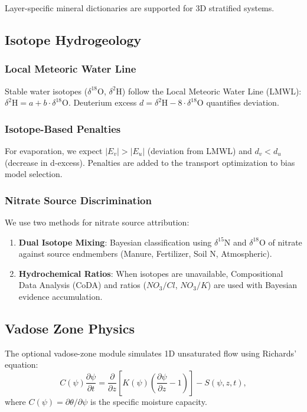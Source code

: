 \documentclass[12pt,a4paper]{article}
\theoremstyle{plain}
\theoremstyle{definition}
\theoremstyle{remark}
\begin{document}
Layer-specific mineral dictionaries are supported for 3D stratified systems.

\subsection{Isotope Hydrogeology}\label{sec:isotope_physics}

\subsubsection{Local Meteoric Water Line}
Stable water isotopes ($\delta^{18}$O, $\delta^2$H) follow the Local Meteoric Water Line (LMWL): $\delta^2\text{H} = a + b \cdot \delta^{18}\text{O}$. Deuterium excess $d = \delta^2\text{H} - 8 \cdot \delta^{18}\text{O}$ quantifies deviation.

\subsubsection{Isotope-Based Penalties}
For evaporation, we expect $|E_v| > |E_u|$ (deviation from LMWL) and $d_v < d_u$ (decrease in d-excess). Penalties are added to the transport optimization to bias model selection.

\subsubsection{Nitrate Source Discrimination}
We use two methods for nitrate source attribution:
\begin{enumerate}
	\item \textbf{Dual Isotope Mixing}: Bayesian classification using $\delta^{15}$N and $\delta^{18}$O of nitrate against source endmembers (Manure, Fertilizer, Soil N, Atmospheric).
	\item \textbf{Hydrochemical Ratios}: When isotopes are unavailable, Compositional Data Analysis (CoDA) and ratios ($NO_3/Cl$, $NO_3/K$) are used with Bayesian evidence accumulation.
\end{enumerate}

\subsection{Vadose Zone Physics}\label{sec:vadose_physics}
The optional vadose-zone module simulates 1D unsaturated flow using Richards' equation:
\begin{equation}\label{eq:richards}
	C(\psi) \frac{\partial \psi}{\partial t} = \frac{\partial}{\partial z} \left[ K(\psi) \left( \frac{\partial \psi}{\partial z} - 1 \right) \right] - S(\psi,z,t),
\end{equation}
where $C(\psi) = \partial \theta / \partial \psi$ is the specific moisture capacity.
\end{document}

